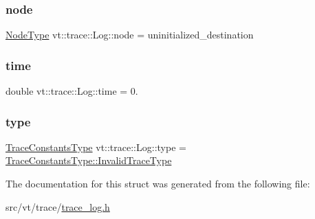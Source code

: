 \mbox{\label{structvt_1_1trace_1_1_log_a39a932cb9c4775f83117d0be477bc8c8}} 
\subsubsection{\texorpdfstring{node}{node}}
{\footnotesize\ttfamily \hyperlink{namespacevt_a866da9d0efc19c0a1ce79e9e492f47e2}{Node\+Type} vt\+::trace\+::\+Log\+::node = uninitialized\+\_\+destination}

\mbox{\label{structvt_1_1trace_1_1_log_a91a7891f5f287385c1323053e3c675c0}} 
\subsubsection{\texorpdfstring{time}{time}}
{\footnotesize\ttfamily double vt\+::trace\+::\+Log\+::time = 0.}

\mbox{\label{structvt_1_1trace_1_1_log_a6415eacd3721d71029ff6edb909fc63d}} 
\subsubsection{\texorpdfstring{type}{type}}
{\footnotesize\ttfamily \hyperlink{namespacevt_1_1trace_acf454dfbd581b0ebae895f90b5927a1d}{Trace\+Constants\+Type} vt\+::trace\+::\+Log\+::type = \hyperlink{namespacevt_1_1trace_acf454dfbd581b0ebae895f90b5927a1da319f6b5fbfb85275879d449149167c7e}{Trace\+Constants\+Type\+::\+Invalid\+Trace\+Type}}



The documentation for this struct was generated from the following file\+:\begin{DoxyCompactItemize}
\item 
src/vt/trace/\hyperlink{trace__log_8h}{trace\+\_\+log.\+h}\end{DoxyCompactItemize}
